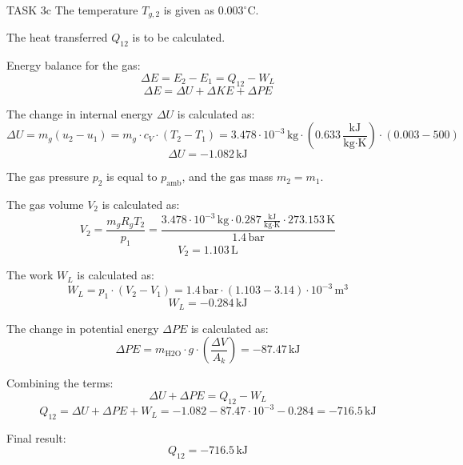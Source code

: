 TASK 3c  
The temperature \( T_{g,2} \) is given as \( 0.003^\circ\text{C} \).  

The heat transferred \( Q_{12} \) is to be calculated.  

Energy balance for the gas:  
\[
\Delta E = E_2 - E_1 = Q_{12} - W_{L}
\]  
\[
\Delta E = \Delta U + \Delta KE + \Delta PE
\]  

The change in internal energy \( \Delta U \) is calculated as:  
\[
\Delta U = m_g (u_2 - u_1) = m_g \cdot c_V \cdot (T_2 - T_1) = 3.478 \cdot 10^{-3} \, \text{kg} \cdot (0.633 \, \frac{\text{kJ}}{\text{kg·K}}) \cdot (0.003 - 500)
\]  
\[
\Delta U = -1.082 \, \text{kJ}
\]  

The gas pressure \( p_2 \) is equal to \( p_{\text{amb}} \), and the gas mass \( m_2 = m_1 \).  

The gas volume \( V_2 \) is calculated as:  
\[
V_2 = \frac{m_g R_g T_2}{p_1} = \frac{3.478 \cdot 10^{-3} \, \text{kg} \cdot 0.287 \, \frac{\text{kJ}}{\text{kg·K}} \cdot 273.153 \, \text{K}}{1.4 \, \text{bar}}
\]  
\[
V_2 = 1.103 \, \text{L}
\]  

The work \( W_{L} \) is calculated as:  
\[
W_{L} = p_1 \cdot (V_2 - V_1) = 1.4 \, \text{bar} \cdot (1.103 - 3.14) \cdot 10^{-3} \, \text{m}^3
\]  
\[
W_{L} = -0.284 \, \text{kJ}
\]  

The change in potential energy \( \Delta PE \) is calculated as:  
\[
\Delta PE = m_{\text{H2O}} \cdot g \cdot \left( \frac{\Delta V}{A_k} \right) = -87.47 \, \text{kJ}
\]  

Combining the terms:  
\[
\Delta U + \Delta PE = Q_{12} - W_{L}
\]  
\[
Q_{12} = \Delta U + \Delta PE + W_{L} = -1.082 - 87.47 \cdot 10^{-3} - 0.284 = -716.5 \, \text{kJ}
\]  

Final result:  
\[
Q_{12} = -716.5 \, \text{kJ}
\]